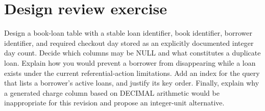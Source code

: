 \section{Design review exercise}

Design a book-loan table with a stable loan identifier, book identifier, borrower identifier, and required checkout day stored as an explicitly documented integer day count. Decide which columns may be NULL and what constitutes a duplicate loan. Explain how you would prevent a borrower from disappearing while a loan exists under the current referential-action limitations. Add an index for the query that lists a borrower's active loans, and justify its key order. Finally, explain why a generated charge column based on DECIMAL arithmetic would be inappropriate for this revision and propose an integer-unit alternative.
